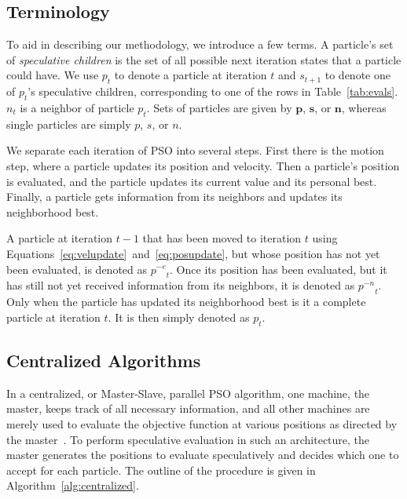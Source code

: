 \documentclass[journal,letterpaper]{IEEEtran}
\newcommand{\alg}[1]{Algorithm~\ref{alg:#1}}
\providecommand{\noeval}[1]{\ensuremath{#1^{-e}}}
\providecommand{\nonbest}[1]{\ensuremath{#1^{-n}}}
\providecommand{\p}{\ensuremath{p}}
\providecommand{\pset}{\ensuremath{\mathbf{p}}}
\providecommand{\s}{\ensuremath{s}}
\providecommand{\sset}{\ensuremath{\mathbf{s}}}
\providecommand{\n}{\ensuremath{n}}
\providecommand{\nset}{\ensuremath{\mathbf{n}}}
\begin{document}
\subsection{Terminology}

To aid in describing our methodology, we introduce a few terms.  A particle's
set of \emph{speculative children} is the set of all possible next iteration
states that a particle could have.  We use $\p_t$ to denote a particle at
iteration $t$ and $\s_{t+1}$ to denote one of $\p_t$'s speculative children,
corresponding to one of the rows in Table~\ref{tab:evals}.  $\n_t$ is a
neighbor of particle $\p_t$.  Sets of particles are given by $\pset$, $\sset$,
or $\nset$, whereas single particles are simply $\p$, $\s$, or $\n$.

We separate each iteration of PSO into several steps.  First there is the
motion step, where a particle updates its position and velocity.  Then a
particle's position is evaluated, and the particle updates its current value
and its personal best.  Finally, a particle gets information from its neighbors
and updates its neighborhood best.

A particle at iteration $t-1$ that has been moved to iteration $t$ using
Equations~\eqref{eq:velupdate}~and~\eqref{eq:posupdate}, but whose position has
not yet been evaluated, is denoted as $\noeval{\p}_t$.  Once its position has
been evaluated, but it has still not yet received information from its
neighbors, it is denoted as $\nonbest{\p}_t$.  Only when the particle has
updated its neighborhood best is it a complete particle at iteration $t$.  It
is then simply denoted as $\p_t$.

\subsection{Centralized Algorithms}

In a centralized, or Master-Slave, parallel PSO algorithm, one machine, the
master, keeps track of all necessary information, and all other machines are
merely used to evaluate the objective function at various positions as directed
by the master~\cite{belal-ijicis04}.  To perform speculative evaluation in such
an architecture, the master generates the positions to evaluate speculatively
and decides which one to accept for each particle.  The outline of the
procedure is given in \alg{centralized}.
\end{document}
